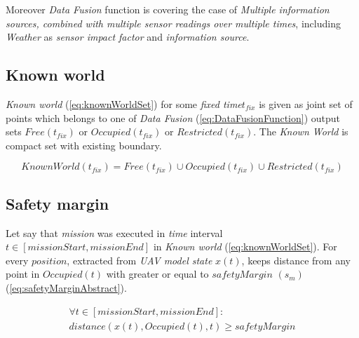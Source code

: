     
    \begin{note}
    Moreover \emph{Data Fusion} function is covering the case of \emph{Multiple information sources, combined with multiple sensor readings over multiple times}, including \emph{Weather} as \emph{sensor impact factor} and \emph{information source}. 
    \end{note}

\subsection{Known world}\label{s:KnownWorld}
    \emph{Known world} (\ref{eq:knownWorldSet}) for some \emph{fixed time}$t_{fix}$ is given as joint set of points which belongs to one of \emph{Data Fusion} (\ref{eq:DataFusionFunction}) output sets $Free(t_{fix})$ or $Occupied(t_{fix})$ or $Restricted(t_{fix})$. The \emph{Known World} is compact set with existing boundary.
    
    \begin{equation}\label{eq:knownWorldSet}
        KnownWorld(t_{fix})= Free(t_{fix}) \cup Occupied(t_{fix}) \cup Restricted(t_{fix})
    \end{equation}



\subsection{Safety margin}\label{s:SafetyMarginDefinition}
    \noindent Let say that \emph{mission} was executed in \emph{time} interval $t\in [missionStart,missionEnd]$ in \emph{Known world} (\ref{eq:knownWorldSet}). For every $position$, extracted from \emph{UAV model state} $x(t)$, keeps distance from any point in $Occupied(t)$  with greater or equal to $safetyMargin$ $(s_m)$ (\ref{eq:safetyMarginAbstract}).  
    
    \begin{multline}\label{eq:safetyMarginAbstract}
        \forall t\in [missionStart,missionEnd]:\\distance(x(t),Occupied(t),t) \ge safetyMargin
    \end{multline}

